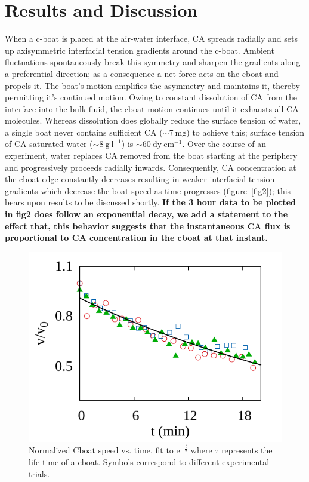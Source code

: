 \documentclass[journal=langd5, manuscript=article, layout=twocolumn]{achemso}
\begin{document}
\section{Results and Discussion}
When a c-boat is placed at the air-water interface, CA spreads radially and sets up axisymmetric interfacial tension gradients around the c-boat. Ambient fluctuations spontaneously break this symmetry and sharpen the gradients along a preferential direction; as a consequence a net force acts on the cboat and propels it. The boat's motion amplifies the asymmetry and maintains it, thereby permitting it's continued motion. Owing to constant dissolution of CA from the interface into the bulk fluid, the cboat motion continues until it exhausts all CA molecules. Whereas dissolution does globally reduce the surface tension of water, a single boat never contains sufficient CA ($\sim 7\ \mathrm{mg}$) to achieve this; surface tension of CA saturated water ($\sim 8\ \mathrm{g\ l^{-1}}$) is $\sim 60\ \mathrm{dy\ cm^{-1}}$. Over the course of an experiment, water replaces CA removed from the boat starting at the periphery and progressively proceeds radially inwards. Consequently, CA concentration at the cboat edge constantly decreases resulting in weaker interfacial tension gradients which decrease the boat speed as time progresses (figure~\ref{fig2}); this bears upon results to be discussed shortly. {\bf If the 3 hour data to be plotted in fig2 does follow an exponential decay, we add a statement to the effect that, this behavior suggests that the instantaneous CA flux is proportional to CA concentration in the cboat at that instant.}

\begin{figure}[ht]
    \begin{center}
       \includegraphics[width=\linewidth]{lifetime.pdf}
    \end{center}
    \caption{Normalized Cboat speed vs. time, fit to $\mathrm{e}^{-\frac{t}{\tau}}$ where $\tau$ represents the life time of a cboat. Symbols correspond to different experimental trials.}
    \label{fig:lifetime}
\end{figure}
\end{document}
